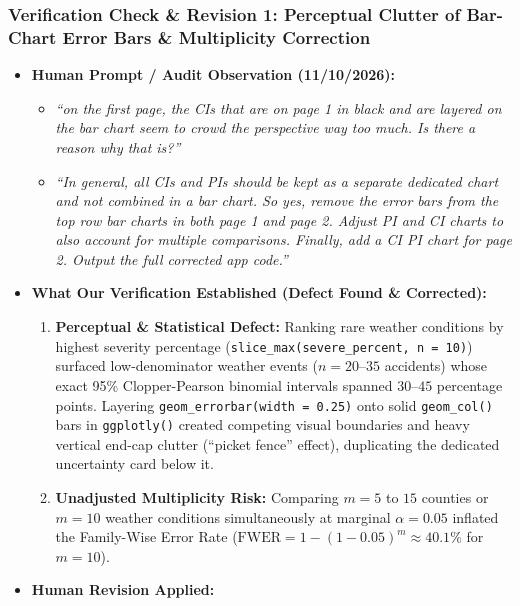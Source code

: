 \documentclass[
  letterpaper,
  DIV=11,
  numbers=noendperiod]{scrartcl}
\providecommand{\tightlist}{%
  \setlength{\itemsep}{0pt}\setlength{\parskip}{0pt}}
\begin{document}
\subsubsection{Verification Check \& Revision 1: Perceptual Clutter of
Bar-Chart Error Bars \& Multiplicity
Correction}\label{verification-check-revision-1-perceptual-clutter-of-bar-chart-error-bars-multiplicity-correction}

\begin{itemize}
\tightlist
\item
  \textbf{Human Prompt / Audit Observation (11/10/2026):}

  \begin{itemize}
  \tightlist
  \item
    \emph{``on the first page, the CIs that are on page 1 in black and
    are layered on the bar chart seem to crowd the perspective way too
    much. Is there a reason why that is?''}
  \item
    \emph{``In general, all CIs and PIs should be kept as a separate
    dedicated chart and not combined in a bar chart. So yes, remove the
    error bars from the top row bar charts in both page 1 and page 2.
    Adjust PI and CI charts to also account for multiple comparisons.
    Finally, add a CI PI chart for page 2. Output the full corrected app
    code.''}
  \end{itemize}
\item
  \textbf{What Our Verification Established (Defect Found \&
  Corrected):}

  \begin{enumerate}
  \def\labelenumi{\arabic{enumi}.}
  \tightlist
  \item
    \textbf{Perceptual \& Statistical Defect:} Ranking rare weather
    conditions by highest severity percentage
    (\texttt{slice\_max(severe\_percent,\ n\ =\ 10)}) surfaced
    low-denominator weather events (\(n = 20\text{–}35\) accidents)
    whose exact 95\% Clopper-Pearson binomial intervals spanned
    \(30\text{–}45\) percentage points. Layering
    \texttt{geom\_errorbar(width\ =\ 0.25)} onto solid
    \texttt{geom\_col()} bars in \texttt{ggplotly()} created competing
    visual boundaries and heavy vertical end-cap clutter (``picket
    fence'' effect), duplicating the dedicated uncertainty card below
    it.
  \item
    \textbf{Unadjusted Multiplicity Risk:} Comparing \(m = 5\) to \(15\)
    counties or \(m = 10\) weather conditions simultaneously at marginal
    \(\alpha = 0.05\) inflated the Family-Wise Error Rate
    (\(\text{FWER} = 1 - (1 - 0.05)^m \approx 40.1\%\) for \(m = 10\)).
  \end{enumerate}
\item
  \textbf{Human Revision Applied:}


\end{itemize}
\end{document}
